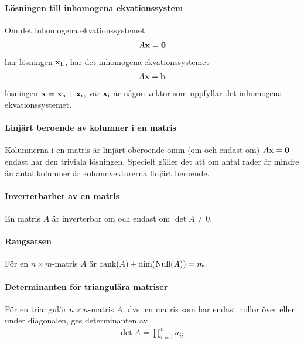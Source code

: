 \paragraph{Lösningen till inhomogena ekvationssystem}
Om det inhomogena ekvationssystemet
\begin{align*}
	A\vect{x} = \vect{0}
\end{align*}
har lösningen $\vect{x}_\text{h}$, har det inhomogena ekvationssystemet
\begin{align*}
	A\vect{x} = \vect{b}
\end{align*}
lösningen $\vect{x} = \vect{x}_\text{h} + \vect{x}_\text{i}$, var $\vect{x}_\text{i}$ är någon vektor som uppfyllar det inhomogena ekvationssystemet.

\proof

\paragraph{Linjärt beroende av kolumner i en matris}
Kolumnerna i en matris är linjärt oberoende omm (om och endast om) $A\vect{x} = \vect{0}$ endast har den triviala lösningen. Specielt gäller det att om antal rader är mindre än antal kolumner är kolumnvektorerna linjärt beroende.

\proof

\paragraph{Inverterbarhet av en matris}
En matris $A$ är inverterbar om och endast om $\det A\neq 0$.

\proof

\paragraph{Rangsatsen}
För en $n\times m$-matris $A$ är $\text{rank}(A) + \text{dim}(\text{Null}(A)) = m$.

\proof

\paragraph{Determinanten för triangulära matriser}
För en triangulär $n\times n$-matris $A$, dvs. en matris som har endast nollor över eller under diagonalen, ges determinanten av
\begin{align*}
	\det{A} = \prod\limits_{i = 1}^{n} a_{ii}.
\end{align*}

\proof

